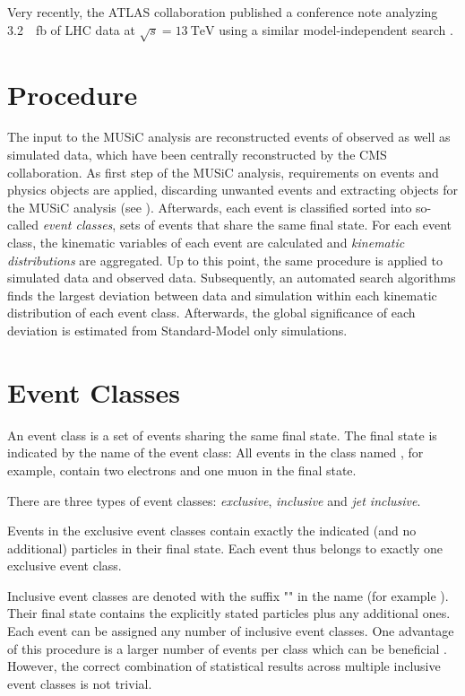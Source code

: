 Very recently, the \ac{ATLAS} collaboration published a conference note analyzing \SI{3.2}{\per\femto\barn} of \ac{LHC} data at $\sqrt{s} = \SI{13}{\TeV}$ using a similar model-independent search \cite{ATLAS:ATLAS-CONF-2017-001}. 

\section{Procedure}
The input to the \ac{MUSiC} analysis are reconstructed events of observed as well as simulated data, which have been centrally reconstructed by the \ac{CMS} collaboration.
As first step of the \ac{MUSiC} analysis, requirements on events and physics objects are applied, discarding unwanted events and extracting objects for the \ac{MUSiC} analysis (see ).
Afterwards, each event is classified sorted into so-called \emph{event classes}, sets of events that share the same final state.
For each event class, the kinematic variables of each event are calculated and \emph{kinematic distributions} are aggregated.
Up to this point, the same procedure is applied to simulated data and observed data.
Subsequently, an automated search algorithms finds the largest deviation between data and simulation within each kinematic distribution of each event class. Afterwards, the global significance of each deviation is estimated from Standard-Model only simulations.

\section{Event Classes}
An event class is a set of events sharing the same final state. The final state is indicated by the name of the event class: All events in the class named \eventclass{2\Pe + 1\Pmu}, for example, contain two electrons and one muon in the final state.

There are three types of event classes: \emph{exclusive}, \emph{inclusive} and \emph{jet inclusive}.

Events in the exclusive event classes contain exactly the indicated (and no additional) particles in their final state. Each event thus belongs to exactly one exclusive event class.

Inclusive event classes are denoted with the suffix "" in the name (for example ). Their final state contains the explicitly stated particles plus any additional ones. Each event can be assigned any number of inclusive event classes. One advantage of this procedure is a larger number of events per class which can be beneficial . However, the correct combination of statistical results across multiple inclusive event classes is not trivial.

